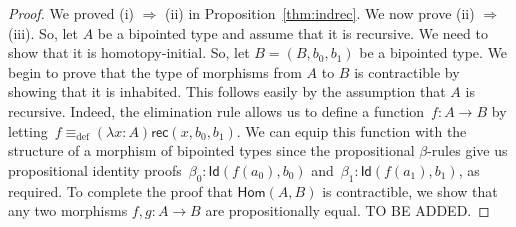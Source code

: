 \documentclass[reqno,10pt,a4paper,oneside]{amsart}
\numberwithin{equation}{section}
\theoremstyle{mythm}
\theoremstyle{mydef}
\theoremstyle{myrmk}
\newcommand{\deq}{\equiv}
\newcommand{\defeq}{\deq_{\mathrm{def}}}
\newcommand{\co}{\colon}
\newcommand{\Id}{\mathsf{Id}}
\newcommand{\rec}{\mathsf{rec}}
\newcommand{\Hom}{\mathsf{Hom}}
\begin{document}
\begin{proof} We proved (i) $\Rightarrow$ (ii) in Proposition~\ref{thm:indrec}. We now prove (ii) $\Rightarrow$ (iii). So, let $A$ be a bipointed type
and assume that it is recursive. We need to show that it is homotopy-initial. So, let $B = (B, b_0, b_1)$ be a bipointed type. We begin to prove
that the type of morphisms from $A$ to $B$ is contractible by showing that it is inhabited. This follows easily by the assumption that $A$
is recursive. Indeed, the elimination rule allows us to define a function~$f \co A \to B$ by letting~$f \defeq (\lambda x \co A) \rec(x, b_0, b_1)$. We can
equip this function with the structure of a morphism of bipointed types since the propositional $\beta$-rules give us propositional identity 
proofs~$\beta_0 \co \Id(f (a_0), b_0)$ and~$\beta_1 \co \Id (f(a_1), b_1)$, as required. To complete the proof that $\Hom(A,B)$ is contractible,
we show that any two morphisms $f, g \co A \to B$ are propositionally equal.  TO BE ADDED.





\end{proof}
\end{document}
